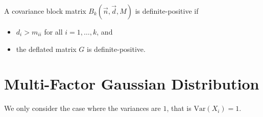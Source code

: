 \documentclass[11pt,fleqn]{book} %
\begin{document}
\begin{corollary}
	A covariance block matrix $B_k(\vec{n},\vec{d},M)$ is definite-positive if
	\begin{itemize}
		\item $d_i > m_{ii}$ for all $i=1,\dots,k$, and
		\item the deflated matrix $G$ is definite-positive.
	\end{itemize}
\end{corollary}

\section{Multi-Factor Gaussian Distribution}
\label{ap:mfgm}

We only consider the case where the variances are $1$, that is $\text{Var}(X_i)=1$.
\end{document}
